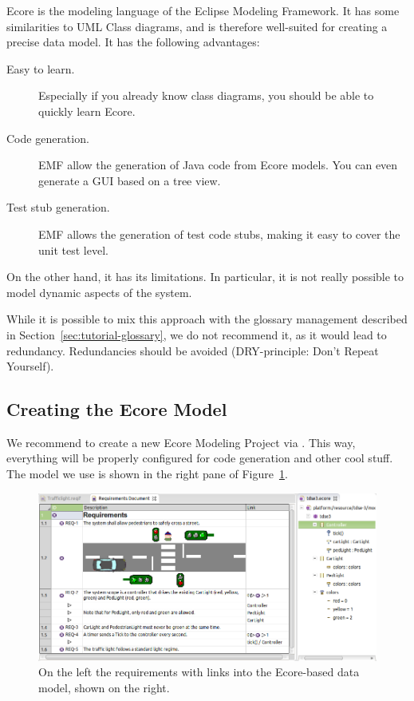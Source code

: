 Ecore is the modeling language of the Eclipse Modeling Framework.  It has some similarities to UML Class diagrams, and is therefore well-suited for creating a precise data model.  It has the following advantages:

\begin{description}
\item[Easy to learn.] Especially if you already know class diagrams, you should be able to quickly learn Ecore.
\item[Code generation.] EMF allow the generation of Java code from Ecore models.  You can even generate a GUI based on a tree view.
\item[Test stub generation.] EMF allows the generation of test code stubs, making it easy to cover the unit test level.
\end{description}

On the other hand, it has its limitations.  In particular, it is not really possible to model dynamic aspects of the system.

\begin{warning}
While it is possible to mix this approach with the glossary management described in Section~\ref{sec:tutorial-glossary}, we do not recommend it, as it would lead to redundancy.  Redundancies should be avoided (DRY-principle: Don't Repeat Yourself).
\end{warning}

\subsection{Creating the Ecore Model}

We recommend to create a new Ecore Modeling Project via .   This way, everything will be properly configured for code generation and other cool stuff.  The model we use is shown in the right pane of Figure~\ref{fig:tutorial-step03}.

\begin{figure}[h!]
  \centering
  \includegraphics[width=\linewidth]{../se-images/tutorial-step03.png}
  \caption{On the left the requirements with links into the Ecore-based data model, shown on the right.}
  \label{fig:tutorial-step03}
\end{figure}

